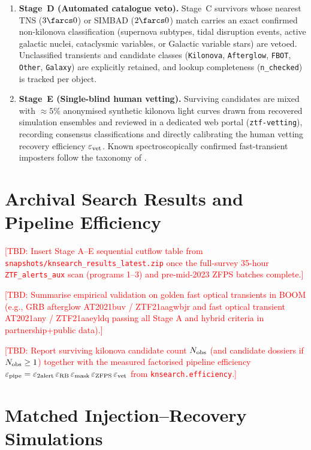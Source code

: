 \documentclass[twocolumn]{aastex631}
\newcommand{\tbd}[1]{\textcolor{red}{[TBD: #1]}}
\newcommand{\epspipe}{\varepsilon_{\rm pipe}}
\begin{document}
\begin{enumerate}
\item \textbf{Stage~D (Automated catalogue veto).} Stage~C survivors whose nearest TNS ($3\farcs0$) or SIMBAD ($2\farcs0$) match carries an exact confirmed non-kilonova classification (supernova subtypes, tidal disruption events, active galactic nuclei, cataclysmic variables, or Galactic variable stars) are vetoed. Unclassified transients and candidate classes (\texttt{Kilonova}, \texttt{Afterglow}, \texttt{FBOT}, \texttt{Other}, \texttt{Galaxy}) are explicitly retained, and lookup completeness (\texttt{n\_checked}) is tracked per object.
\item \textbf{Stage~E (Single-blind human vetting).} Surviving candidates are mixed with $\approx 5\%$ anonymised synthetic kilonova light curves drawn from recovered simulation ensembles and reviewed in a dedicated web portal (\texttt{ztf-vetting}), recording consensus classifications and directly calibrating the human vetting recovery efficiency $\varepsilon_{\rm vet}$. Known spectroscopically confirmed fast-transient imposters follow the taxonomy of \citet{Barna2025}.
\end{enumerate}

\section{Archival Search Results and Pipeline Efficiency}
\label{sec:search_results}

\tbd{Insert Stage A--E sequential cutflow table from \texttt{snapshots/knsearch\_results\_latest.zip} once the full-survey 35-hour \texttt{ZTF\_alerts\_aux} scan (programs 1--3) and pre-mid-2023 ZFPS batches complete.}

\tbd{Summarise empirical validation on golden fast optical transients in BOOM (e.g., GRB afterglow AT2021buv / ZTF21aagwbjr and fast optical transient AT2021any / ZTF21aaeyldq passing all Stage A and hybrid criteria in partnership+public data).}

\tbd{Report surviving kilonova candidate count $N_{\rm obs}$ (and candidate dossiers if $N_{\rm obs} \ge 1$) together with the measured factorised pipeline efficiency $\epspipe = \varepsilon_{\rm 2alert}\,\varepsilon_{\rm RB}\,\varepsilon_{\rm mask}\,\varepsilon_{\rm ZFPS}\,\varepsilon_{\rm vet}$ from \texttt{knsearch.efficiency}.}

\section{Matched Injection--Recovery Simulations}
\label{sec:methods}
\end{document}
